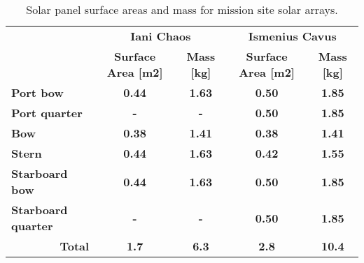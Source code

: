 \begin{table}[h]
\footnotesize
\centering
\caption{Solar panel surface areas and mass for mission site solar arrays.}
\label{tab:solar-panel-surface-areas}
\begin{tabular}{l|c|c|c|c|}
\cline{2-5}
\textbf{} & \multicolumn{2}{c|}{\textbf{Iani Chaos}} & \multicolumn{2}{c|}{\textbf{Ismenius Cavus}} \\ \cline{2-5}
 & \textbf{Surface Area {[}m2{]}} & \textbf{Mass {[}kg{]}} & \textbf{Surface Area {[}m2{]}} & \textbf{Mass {[}kg{]}} \\ \hline
\multicolumn{1}{|l|}{{\color[HTML]{A6DBA0} \textbf{Port bow}}} & {\color[HTML]{A6DBA0} \textbf{0.44}} & {\color[HTML]{A6DBA0} \textbf{1.63}} & {\color[HTML]{A6DBA0} \textbf{0.50}} & {\color[HTML]{A6DBA0} \textbf{1.85}} \\ \hline
\multicolumn{1}{|l|}{{\color[HTML]{5AAE61} \textbf{Port quarter}}} & {\color[HTML]{5AAE61} \textbf{-}} & {\color[HTML]{5AAE61} \textbf{-}} & {\color[HTML]{5AAE61} \textbf{0.50}} & {\color[HTML]{5AAE61} \textbf{1.85}} \\ \hline
\multicolumn{1}{|l|}{{\color[HTML]{F4A582} \textbf{Bow}}} & {\color[HTML]{F4A582} \textbf{0.38}} & {\color[HTML]{F4A582} \textbf{1.41}} & {\color[HTML]{F4A582} \textbf{0.38}} & {\color[HTML]{F4A582} \textbf{1.41}} \\ \hline
\multicolumn{1}{|l|}{{\color[HTML]{D6604D} \textbf{Stern}}} & {\color[HTML]{D6604D} \textbf{0.44}} & {\color[HTML]{D6604D} \textbf{1.63}} & {\color[HTML]{D6604D} \textbf{0.42}} & {\color[HTML]{D6604D} \textbf{1.55}} \\ \hline
\multicolumn{1}{|l|}{{\color[HTML]{92C5DE} \textbf{Starboard bow}}} & {\color[HTML]{92C5DE} \textbf{0.44}} & {\color[HTML]{92C5DE} \textbf{1.63}} & {\color[HTML]{92C5DE} \textbf{0.50}} & {\color[HTML]{92C5DE} \textbf{1.85}} \\ \hline
\multicolumn{1}{|l|}{{\color[HTML]{4393C3} \textbf{Starboard quarter}}} & {\color[HTML]{4393C3} \textbf{-}} & {\color[HTML]{4393C3} \textbf{-}} & {\color[HTML]{4393C3} \textbf{0.50}} & {\color[HTML]{4393C3} \textbf{1.85}} \\ \hline
\multicolumn{1}{|r|}{\textbf{Total}} & \textbf{1.7} & \textbf{6.3} & \textbf{2.8} & \textbf{10.4} \\ \hline
\end{tabular}
\end{table}
